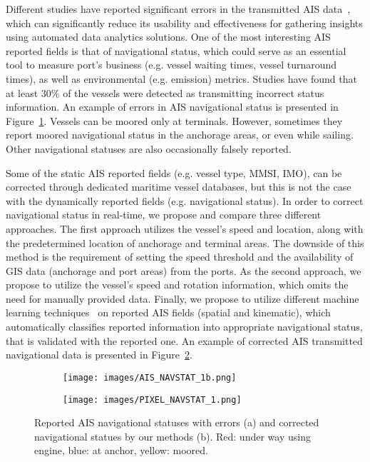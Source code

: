 \documentclass[conference]{IEEEtran}
\begin{document}
Different studies have reported significant errors in the transmitted AIS data~\cite{AIS_error}, which can significantly reduce its usability and effectiveness for gathering insights using automated data analytics solutions. One of the most interesting AIS reported fields is that of navigational status, which could serve as an essential tool to measure port's business (e.g. vessel waiting times, vessel turnaround times), as well as environmental (e.g. emission) metrics. Studies have found that at least 30\% of the vessels were detected as transmitting incorrect status information. An example of errors in AIS navigational status is presented in Figure~\ref{fig:AIS_NAVSTAT_1b}. Vessels can be moored only at terminals. However, sometimes they report moored navigational status in the anchorage areas, or even while sailing. Other navigational statuses are also occasionally falsely reported.

Some of the static AIS reported fields (e.g. vessel type, MMSI, IMO), can be corrected through dedicated maritime vessel databases, but this is not the case with the dynamically reported fields (e.g. navigational status). In order to correct navigational status in real-time, we propose and compare three different approaches. The first approach utilizes the vessel's speed and location, along with the predetermined location of anchorage and terminal areas. The downside of this method is the requirement of setting the speed threshold and the availability of GIS data (anchorage and port areas) from the ports. As the second approach, we propose to utilize the vessel's speed and rotation information, which omits the need for manually provided data. Finally, we propose to utilize different machine learning techniques~\cite{clustering1,catboost} on reported AIS fields (spatial and kinematic), which automatically classifies reported information into appropriate navigational status, that is validated with the reported one. An example of corrected AIS transmitted navigational data is presented in Figure~\ref{fig:PIXEL_NAVSTAT_1}.

\begin{figure*}[htbp]
    \centering
    \begin{subfigure}{0.49\textwidth}
      \texttt{[image: images/AIS\_NAVSTAT\_1b.png]}
      \caption{}
      \label{fig:AIS_NAVSTAT_1b}
    \end{subfigure}\hfil
        \begin{subfigure}{0.49\textwidth}
      \texttt{[image: images/PIXEL\_NAVSTAT\_1.png]}
      \caption{}
      \label{fig:PIXEL_NAVSTAT_1}
    \end{subfigure}\hfil
    \caption{Reported AIS navigational statuses with errors (a) and corrected navigational statues by our methods (b). Red: under way using engine, blue: at anchor, yellow: moored.}
    \label{fig:ppa_navstat}
\end{figure*}
\end{document}
